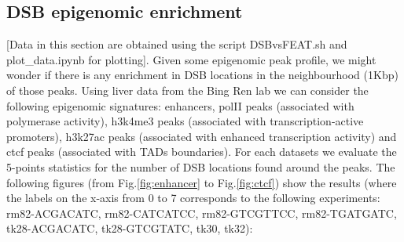 \documentclass[11pt,a4paper]{article}
\begin{document}
\subsection{DSB epigenomic enrichment}
[Data in this section are obtained using the script DSBvsFEAT.sh and  plot{\_}data.ipynb for plotting].
Given some epigenomic peak profile, we might wonder if there is any enrichment 
in DSB locations in the neighbourhood (1Kbp) of those peaks. Using liver data from the Bing Ren lab we can consider the following epigenomic signatures: 
enhancers, polII peaks (associated with polymerase activity), h3k4me3 peaks (associated with transcription-active promoters), h3k27ac peaks (associated with enhanced transcription activity) and ctcf peaks (associated with TADs boundaries). For each datasets we evaluate the 5-points statistics for the number of DSB locations found around the peaks. The following figures (from Fig.\ref{fig:enhancer} to Fig.\ref{fig:ctcf}) show the results (where the labels on the x-axis from 0 to 7 corresponds to the 
following experiments:  rm82-ACGACATC, rm82-CATCATCC, rm82-GTCGTTCC, rm82-TGATGATC, tk28-ACGACATC, tk28-GTCGTATC, tk30, tk32):
\end{document}
